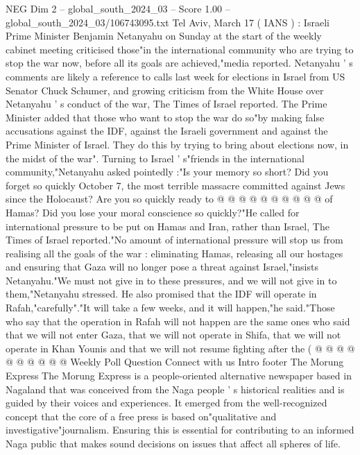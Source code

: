 \begin{textsample}{NEG Dim 2 – global\_south\_2024\_03 – Score 1.00 – global\_south\_2024\_03/106743095.txt}  \label{ex:f2_neg_435}
Tel Aviv, March 17 ( IANS ) : Israeli Prime Minister Benjamin Netanyahu on Sunday at the start of the weekly cabinet meeting criticised those"in the international community who are trying to stop the war now, before all its goals are achieved,"media reported.
Netanyahu ' s comments are likely a reference to calls last week for elections in Israel from US Senator Chuck Schumer, and growing criticism from the White House over Netanyahu ' s conduct of the war, The Times of Israel reported.
The Prime Minister added that those who want to stop the war do so"by making false accusations against the IDF, against the Israeli government and against the Prime Minister of Israel.
They do this by trying to bring about elections now, in the midst of the war".
Turning to Israel ' s"friends in the international community,"Netanyahu asked pointedly :"Is your memory so short?
Did you forget so quickly October 7, the most terrible massacre committed against Jews since the Holocaust?
Are you so quickly ready to @ @ @ @ @ @ @ @ @ @ of Hamas?
Did you lose your moral conscience so quickly?"He called for international pressure to be put on Hamas and Iran, rather than Israel, The Times of Israel reported."No amount of international pressure will stop us from realising all the goals of the war : eliminating Hamas, releasing all our hostages and ensuring that Gaza will no longer pose a threat against Israel,"insists Netanyahu."We must not give in to these pressures, and we will not give in to them,"Netanyahu stressed.
He also promised that the IDF will operate in Rafah,"carefully"."It will take a few weeks, and it will happen,"he said."Those who say that the operation in Rafah will not happen are the same ones who said that we will not enter Gaza, that we will not operate in Shifa, that we will not operate in Khan Younis and that we will not resume fighting after the ( @ @ @ @ @ @ @ @ @ @ Weekly Poll Question Connect with us Intro footer The Morung Express The Morung Express is a people-oriented alternative newspaper based in Nagaland that was conceived from the Naga people ' s historical realities and is guided by their voices and experiences.
It emerged from the well-recognized concept that the core of a free press is based on"qualitative and investigative"journalism.
Ensuring this is essential for contributing to an informed Naga public that makes sound decisions on issues that affect all spheres of life.

\end{textsample}
